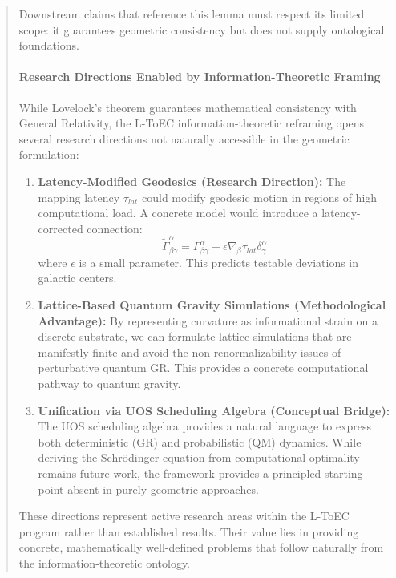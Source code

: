 \documentclass[11pt,titlepage]{article}
\begin{document}
\begin{abstract}
Downstream claims that reference this lemma must respect its limited scope: it guarantees geometric consistency but does not supply ontological foundations.


\paragraph{Research Directions Enabled by Information-Theoretic Framing}
While Lovelock's theorem guarantees mathematical consistency with General Relativity, the L-ToEC information-theoretic reframing opens several research directions not naturally accessible in the geometric formulation:

\begin{enumerate}
    \item \textbf{Latency-Modified Geodesics (Research Direction):} The mapping latency $\tau_{lat}$ could modify geodesic motion in regions of high computational load. A concrete model would introduce a latency-corrected connection:
    \[
    \tilde{\Gamma}^\alpha_{\beta\gamma} = \Gamma^\alpha_{\beta\gamma} + \epsilon \nabla_\beta \tau_{lat} \delta^\alpha_\gamma
    \]
    where $\epsilon$ is a small parameter. This predicts testable deviations in galactic centers.
    
    \item \textbf{Lattice-Based Quantum Gravity Simulations (Methodological Advantage):} By representing curvature as informational strain on a discrete substrate, we can formulate lattice simulations that are manifestly finite and avoid the non-renormalizability issues of perturbative quantum GR. This provides a concrete computational pathway to quantum gravity.
    
    \item \textbf{Unification via UOS Scheduling Algebra (Conceptual Bridge):} The UOS scheduling algebra provides a natural language to express both deterministic (GR) and probabilistic (QM) dynamics. While deriving the Schr\"odinger equation from computational optimality remains future work, the framework provides a principled starting point absent in purely geometric approaches.
\end{enumerate}

These directions represent active research areas within the L-ToEC program rather than established results. Their value lies in providing concrete, mathematically well-defined problems that follow naturally from the information-theoretic ontology.

\end{abstract}
\end{document}
